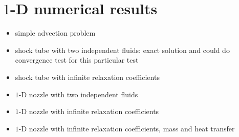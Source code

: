 \documentclass[preprint,10pt]{elsarticle}
\begin{document}
\section{$1$-D numerical results}\label{sec:results}
\begin{itemize}
\item simple advection problem
\item shock tube with two independent fluids: exact solution and could do convergence test for this particular test
\item shock tube with infinite relaxation coefficients
\item $1$-D nozzle with two independent fluids
\item $1$-D nozzle with infinite relaxation coefficients
\item $1$-D nozzle with infinite relaxation coefficients,  mass and heat transfer
\end{itemize}

\appendix
\end{document}
